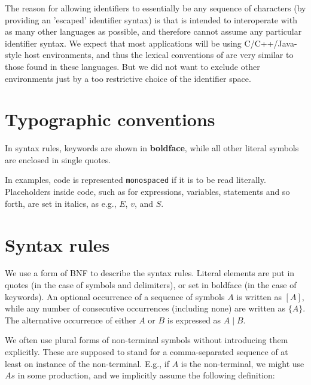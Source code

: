 \begin{rationale}
  The reason for allowing identifiers to essentially be any sequence
  of characters (by providing an 'escaped' identifier syntax) is that
  \Cal is intended to interoperate with as many other languages as
  possible, and therefore cannot assume any particular identifier
  syntax.
  We expect that most applications will be using C/C++/Java-style host
  environments, and thus the lexical conventions of \Cal are very
  similar to those found in these languages. But we did not want to
  exclude other environments just by a too restrictive choice of the
  identifier space.
\end{rationale}

\section{Typographic conventions}

In syntax rules, keywords are shown in {\bf boldface}, while all other
literal symbols are enclosed in single quotes. 

In examples, \Cal code is represented {\tt monospaced} if it is to be
read literally. Placeholders inside \Cal code, such as for
expressions, variables, statements and so forth, are set in italics,
as e.g., $E$, $v$, and $S$.

\section{Syntax rules}


We use a form of BNF to describe the syntax rules. Literal elements
are put in quotes (in the case of symbols and delimiters), or set in
boldface (in the case of keywords). An optional occurrence of a
sequence of symbols $A$
is written as $[A]$, while any number of consecutive occurrences
(including none) are written as $\{A\}$. The alternative occurrence of
either $A$ or $B$ is expressed as $A \mid B$.

We often use plural forms of
non-terminal symbols without introducing them explicitly. These are
supposed to stand for a comma-separated sequence of at least on instance of the
non-terminal. E.g., if $A$ is the non-terminal, we might use $As$ in
some production, and we implicitly assume the following definition:

